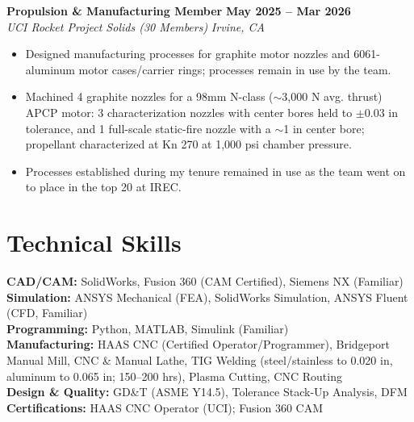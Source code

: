 \documentclass[10.5pt,letterpaper]{article}
\newenvironment{tightitemize}{%
  \begin{itemize}[leftmargin=13pt, itemsep=0pt, topsep=1pt, parsep=0pt, partopsep=0pt]
}{\end{itemize}}
\newcommand{\entry}[4]{%
  \textbf{#1} \hfill \textbf{#2}\\
  \textit{#3} \hfill \textit{#4}\\[-3pt]
}
\begin{document}
\entry{Propulsion \& Manufacturing Member}{May 2025 -- Mar 2026}{UCI Rocket Project Solids (30 Members)}{Irvine, CA}
\begin{tightitemize}
  \item Designed manufacturing processes for graphite motor nozzles and 6061-aluminum motor cases/carrier rings; processes remain in use by the team.
  \item Machined 4 graphite nozzles for a 98mm N-class ($\sim$3{,}000 N avg. thrust) APCP motor: 3 characterization nozzles with center bores held to $\pm$0.03 in tolerance, and 1 full-scale static-fire nozzle with a $\sim$1 in center bore; propellant characterized at Kn 270 at 1{,}000 psi chamber pressure.
  \item Processes established during my tenure remained in use as the team went on to place in the top 20 at IREC.
\end{tightitemize}

\section{Technical Skills}
\textbf{CAD/CAM:} SolidWorks, Fusion 360 (CAM Certified), Siemens NX (Familiar)\\
\textbf{Simulation:} ANSYS Mechanical (FEA), SolidWorks Simulation, ANSYS Fluent (CFD, Familiar)\\
\textbf{Programming:} Python, MATLAB, Simulink (Familiar)\\
\textbf{Manufacturing:} HAAS CNC (Certified Operator/Programmer), Bridgeport Manual Mill, CNC \& Manual Lathe, TIG Welding (steel/stainless to 0.020 in, aluminum to 0.065 in; 150--200 hrs), Plasma Cutting, CNC Routing\\
\textbf{Design \& Quality:} GD\&T (ASME Y14.5), Tolerance Stack-Up Analysis, DFM\\
\textbf{Certifications:} HAAS CNC Operator (UCI); Fusion 360 CAM
\end{document}
